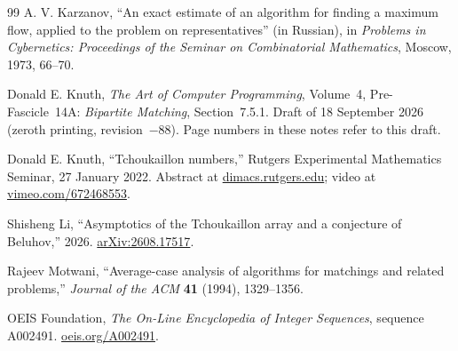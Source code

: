 \begin{thebibliography}{99}
A. V. Karzanov, ``An exact estimate of an algorithm for finding a maximum
flow, applied to the problem on representatives'' (in Russian), in
\emph{Problems in Cybernetics: Proceedings of the Seminar on Combinatorial
Mathematics}, Moscow, 1973, 66--70.

Donald E. Knuth, \emph{The Art of Computer Programming}, Volume~4,
Pre-Fascicle~14A: \emph{Bipartite Matching}, Section~7.5.1. Draft of
18 September 2026 (zeroth printing, revision~$-88$). Page numbers in these
notes refer to this draft.

Donald E. Knuth, ``Tchoukaillon numbers,'' Rutgers Experimental Mathematics
Seminar, 27 January 2022. Abstract at
\href{https://dimacs.rutgers.edu/dimacsevents/seminar-details/tchoukaillon-numbers}{dimacs.rutgers.edu};
video at \href{https://vimeo.com/672468553}{vimeo.com/672468553}.

Shisheng Li, ``Asymptotics of the Tchoukaillon array and a conjecture of
Beluhov,'' 2026. \href{https://arxiv.org/abs/2608.17517}{arXiv:2608.17517}.

Rajeev Motwani, ``Average-case analysis of algorithms for matchings and
related problems,'' \emph{Journal of the ACM} \textbf{41} (1994), 1329--1356.

OEIS Foundation, \emph{The On-Line Encyclopedia of Integer Sequences},
sequence A002491. \href{https://oeis.org/A002491}{oeis.org/A002491}.

\end{thebibliography}
